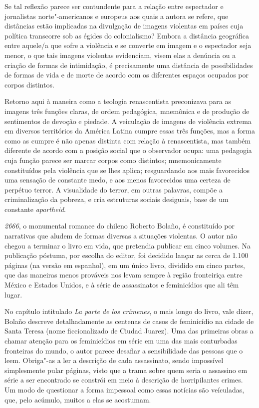 Se tal reflexão parece ser contundente para a relação entre espectador e
jornalistas norte"-americanos e europeus aos quais a autora se refere,
que distâncias estão implicadas na divulgação de imagens violentas em
países cuja política transcorre sob as égides do colonialismo? Embora a
distância geográfica entre aquele/a que sofre a violência e se converte
em imagem e o espectador seja menor, o que tais imagens violentas
evidenciam, visem elas a denúncia ou a criação de formas de intimidação,
é precisamente uma distância de possibilidades de formas de vida e de
morte de acordo com os diferentes espaços ocupados por corpos distintos.

Retorno aqui à maneira como a teologia renascentista preconizava para as imagens três funções
claras, de ordem pedagógica, mnemônica e de produção de sentimentos de
devoção e piedade. A veiculação de imagens de violência extrema em
diversos territórios da América Latina cumpre essas três funções, mas
a forma como as cumpre é não apenas distinta com relação à
renascentista, mas também diferente de acordo com a posição
social que o observador ocupa: uma pedagogia cuja função parece ser
marcar corpos como distintos; mnemonicamente constituídos pela violência
que se lhes aplica; resguardando aos mais favorecidos uma sensação de
constante medo, e aos menos favorecidos uma certeza de perpétuo terror.
A visualidade do terror, em outras palavras, compõe a criminalização da
pobreza, e cria estruturas sociais desiguais, base de um constante \emph{apartheid}.

\asterisc

\emph{2666}, o monumental romance do chileno Roberto Bolaño, é
constituído por narrativas que aludem de formas diversas a situações
violentas. O autor não chegou a terminar o livro em vida, que pretendia
publicar em cinco volumes. Na publicação póstuma, por escolha do editor,
foi decidido lançar as cerca de 1.100 páginas (na versão em espanhol),
em um único livro, dividido em cinco partes, que das maneiras menos
prováveis nos levam sempre à região fronteiriça entre México e Estados
Unidos, e à série de assassinatos e feminicídios que ali têm lugar.

No capítulo intitulado \emph{La parte de los crímenes}, o mais longo do
livro, vale dizer, Bolaño descreve detalhadamente as centenas de casos
de feminicídio na cidade de Santa Teresa (nome ficcionalizado de Ciudad
Juarez). Uma das primeiras obras a chamar atenção para os feminicídios
em série em uma das mais conturbadas fronteiras do mundo, o autor parece
desafiar a sensibilidade das pessoas que o leem. Obriga"-as a ler a
descrição de cada assassinato, sendo impossível simplesmente pular
páginas, visto que a trama sobre quem seria o assassino em série a ser
encontrado se constrói em meio à descrição de horripilantes crimes. Um
modo de questionar a forma impessoal como essas notícias são
veículadas, que, pelo acúmulo, muitos a elas se acostumam.

